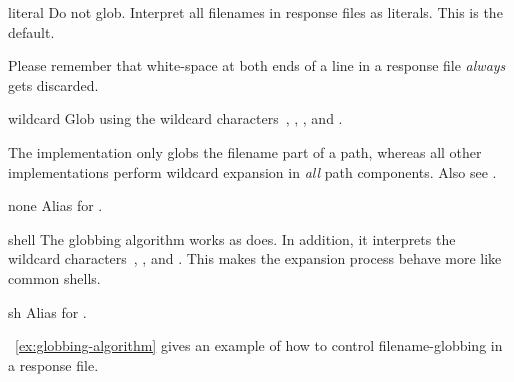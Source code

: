\begin{table}
  \begin{minipage}{\linewidth}
    \begin{codelist}
    \item[literal]\itemend
      Do not glob.  Interpret all filenames in response files as literals. This is the default.

      Please remember that white-space at both ends of a line in a response file \emph{always}
      gets discarded.

    \item[wildcard]\itemend
      Glob using the wildcard characters~, \sample{*}, \sample{[}, and \sample{]}.

      The  implementation only globs the filename part of a path, whereas all
      other implementations perform wildcard expansion in \emph{all} path components.  Also see
      .

    \item[none]\itemend
      Alias for .

    \item[shell]\itemend
      The  globbing algorithm works as  does.  In addition, it
      interprets the wildcard characters~\sample{\{}, \sample{\atsign}, and \sample{\squiggle}.
      This makes the expansion process behave more like common 
      shells.

    \item[sh]\itemend
      Alias for .
    \end{codelist}
  \end{minipage}

  \caption[Globbing algorithms]{\label{tab:globbing-algorithms}%
    Globbing algorithms for the use in response files.}
\end{table}

\exampleName~\ref{ex:globbing-algorithm} gives an example of how to control filename-globbing in
a response file.

